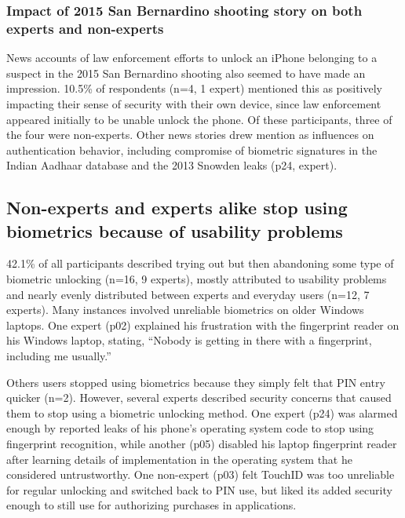 \subsubsection{Impact of 2015 San Bernardino shooting story on both experts and non-experts}
News accounts of law enforcement efforts to unlock an iPhone belonging to a suspect in the 2015 San Bernardino shooting also seemed to have made an impression. 10.5\% of respondents (n=4, 1 expert) mentioned this as positively impacting their sense of security with their own device, since law enforcement appeared initially to be unable unlock the phone. Of these participants, three of the four were non-experts. Other news stories drew mention as influences on authentication behavior, including compromise of biometric signatures in the Indian Aadhaar database and the 2013 Snowden leaks (p24, expert). 

  
 
\subsection{Non-experts and experts alike stop using biometrics because of usability problems}
42.1\% of all participants described trying out but then abandoning some type of biometric unlocking (n=16, 9 experts), mostly attributed to usability problems and nearly evenly distributed between experts and everyday users (n=12, 7 experts). Many instances involved unreliable biometrics on older Windows laptops. One expert (p02) explained his frustration with the fingerprint reader on his Windows laptop, stating, ``Nobody is getting in there with a fingerprint, including me usually.'' 

Others users stopped using biometrics because they simply felt that PIN entry quicker (n=2). However, several experts described security concerns that caused them to stop using a biometric unlocking method. One expert (p24) was alarmed enough by reported leaks of his phone's operating system code to stop using fingerprint recognition, while another (p05) disabled his laptop fingerprint reader after learning details of implementation in the operating system that he considered untrustworthy. One non-expert (p03) felt TouchID was too unreliable for regular unlocking and switched back to PIN use, but liked its added security enough to still use for authorizing purchases in applications. 

